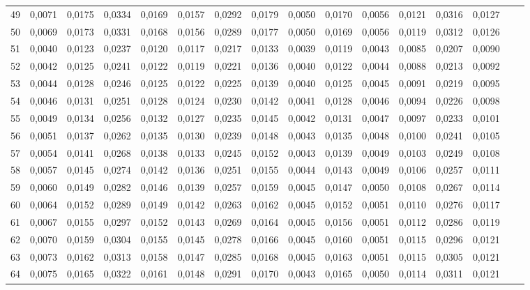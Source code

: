 \begin{table}[htp!]
\begin{adjustwidth}{-1cm}{}
\begin{tabular}{ l | *{15}{| r}}
49	&	0,0071	&	0,0175	&	0,0334	&	0,0169	&	0,0157	&	0,0292	&	0,0179	&	0,0050	&	0,0170	&	0,0056	&	0,0121	&	0,0316	&	0,0127	\\
50	&	0,0069	&	0,0173	&	0,0331	&	0,0168	&	0,0156	&	0,0289	&	0,0177	&	0,0050	&	0,0169	&	0,0056	&	0,0119	&	0,0312	&	0,0126	\\
51	&	0,0040	&	0,0123	&	0,0237	&	0,0120	&	0,0117	&	0,0217	&	0,0133	&	0,0039	&	0,0119	&	0,0043	&	0,0085	&	0,0207	&	0,0090	\\
52	&	0,0042	&	0,0125	&	0,0241	&	0,0122	&	0,0119	&	0,0221	&	0,0136	&	0,0040	&	0,0122	&	0,0044	&	0,0088	&	0,0213	&	0,0092	\\
53	&	0,0044	&	0,0128	&	0,0246	&	0,0125	&	0,0122	&	0,0225	&	0,0139	&	0,0040	&	0,0125	&	0,0045	&	0,0091	&	0,0219	&	0,0095	\\
54	&	0,0046	&	0,0131	&	0,0251	&	0,0128	&	0,0124	&	0,0230	&	0,0142	&	0,0041	&	0,0128	&	0,0046	&	0,0094	&	0,0226	&	0,0098	\\
55	&	0,0049	&	0,0134	&	0,0256	&	0,0132	&	0,0127	&	0,0235	&	0,0145	&	0,0042	&	0,0131	&	0,0047	&	0,0097	&	0,0233	&	0,0101	\\
56	&	0,0051	&	0,0137	&	0,0262	&	0,0135	&	0,0130	&	0,0239	&	0,0148	&	0,0043	&	0,0135	&	0,0048	&	0,0100	&	0,0241	&	0,0105	\\
57	&	0,0054	&	0,0141	&	0,0268	&	0,0138	&	0,0133	&	0,0245	&	0,0152	&	0,0043	&	0,0139	&	0,0049	&	0,0103	&	0,0249	&	0,0108	\\
58	&	0,0057	&	0,0145	&	0,0274	&	0,0142	&	0,0136	&	0,0251	&	0,0155	&	0,0044	&	0,0143	&	0,0049	&	0,0106	&	0,0257	&	0,0111	\\
59	&	0,0060	&	0,0149	&	0,0282	&	0,0146	&	0,0139	&	0,0257	&	0,0159	&	0,0045	&	0,0147	&	0,0050	&	0,0108	&	0,0267	&	0,0114	\\
60	&	0,0064	&	0,0152	&	0,0289	&	0,0149	&	0,0142	&	0,0263	&	0,0162	&	0,0045	&	0,0152	&	0,0051	&	0,0110	&	0,0276	&	0,0117	\\
61	&	0,0067	&	0,0155	&	0,0297	&	0,0152	&	0,0143	&	0,0269	&	0,0164	&	0,0045	&	0,0156	&	0,0051	&	0,0112	&	0,0286	&	0,0119	\\
62	&	0,0070	&	0,0159	&	0,0304	&	0,0155	&	0,0145	&	0,0278	&	0,0166	&	0,0045	&	0,0160	&	0,0051	&	0,0115	&	0,0296	&	0,0121	\\
63	&	0,0073	&	0,0162	&	0,0313	&	0,0158	&	0,0147	&	0,0285	&	0,0168	&	0,0045	&	0,0163	&	0,0051	&	0,0115	&	0,0305	&	0,0121	\\
64	&	0,0075	&	0,0165	&	0,0322	&	0,0161	&	0,0148	&	0,0291	&	0,0170	&	0,0043	&	0,0165	&	0,0050	&	0,0114	&	0,0311	&	0,0121	\\

\end{tabular}
\end{adjustwidth}
\end{table}

